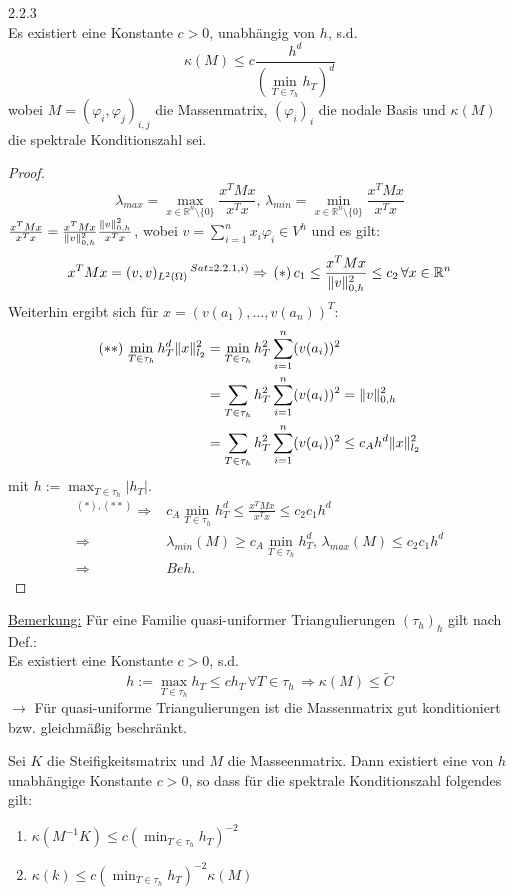 \begin{satz}{2.2.3}\\
  Es existiert eine Konstante $c>0$, unabhängig von $h$, s.d. 
  \[\kappa (M) \leq c \frac{h^d}{(\min_{T \in \tau_h} h_T)^d} \]
  wobei $M=(\varphi_i,\varphi_j)_{i,j}$ die Massenmatrix, $(\varphi_i)_i$ die nodale Basis und $\kappa (M)$ die spektrale Konditionszahl sei.
\end{satz}
\begin{proof}
  \[\lambda_{max}=\max_{x  \in \mathbb{R}^n\setminus \{ 0 \}} \frac{x^TMx}{x^Tx} , \, \lambda_{min}=\min_{x  \in \mathbb{R}^n\setminus \{ 0 \}} \frac{x^TMx}{x^Tx} \]
  $ \frac{x^TMx}{x^Tx}=\frac{x^TMx}{\|v\|^2_{0,h}}\frac{\|v\|^2_{0,h}}{x^Tx}$, wobei $v=\sum_{i=1}^n x_i\varphi_i \in V^h$ und es gilt:
  \[x^TMx=(v,v)_{L^2(\Omega)}\, ^{Satz 2.2.1,i)} \Rightarrow\, (*) \, c_1 \leq \frac{x^TMx}{\|v\|^2_{0,h}} \leq c_2 \, \forall x \in \mathbb{R}^n \]
  Weiterhin ergibt sich für $x=(v(a_1),\dots,v(a_n))^T$:
  \begin{align*}
    (**) \, \min_{T \in \tau_h} h^d_T \|x\|^2_{l_2} &= \min_{T \in \tau_h} h^2_T \sum_{i=1}^n (v(a_i))^2 \\
    &= \sum_{T \in \tau_h} h^2_T \sum_{i=1}^n (v(a_i))^2 = \|v\|^2_{0,h} \\
    &=  \sum_{T \in \tau_h} h^2_T \sum_{i=1}^n (v(a_i))^2 \leq c_A h^d \|x\|^2_{l_2}
  \end{align*}
  mit $h:= \max_{T \in \tau_h} |h_T| $.
  \begin{align*}
    ^{(*),(**)}\Rightarrow& c_A \min_{T \in \tau_h} h^d_T \leq \frac{x^TMx}{x^Tx} \leq c_2c_1 h^d\\
    \Rightarrow & \lambda_{min}(M) \geq c_A \min_{T \in \tau_h} h^d_T, \, \lambda_{max} (M) \leq c_2c_1 h^d \\
    \Rightarrow & Beh. 
  \end{align*}
\end{proof}
\underline{Bemerkung:} Für eine Familie quasi-uniformer Triangulierungen $(\tau_h)_h$ gilt nach Def.:\\
Es existiert eine Konstante $c>0$, s.d. 
\[ h:= \max_{T \in \tau_h} h_T \leq c h_T \, \forall  T \in \tau_h \, \Rightarrow \kappa (M) \leq \tilde C \]
$\rightarrow$ Für quasi-uniforme Triangulierungen ist die Massenmatrix gut konditioniert bzw. gleichmäßig beschränkt.\\

\begin{satz}%
  Sei $K$ die Steifigkeitsmatrix und $M$ die Masseenmatrix. Dann existiert eine von $h$ unabhängige Konstante $c>0$, so dass für die spektrale Konditionszahl folgendes gilt:
  \begin{enumerate}
    \item $\kappa(M^{-1}K) \leq c(\min_{T\in\tau_h} h_T)^{-2}$
    \item $\kappa(k) \leq c(\min_{T\in\tau_h} h_T)^{-2} \kappa(M)$
  \end{enumerate}
\end{satz}

